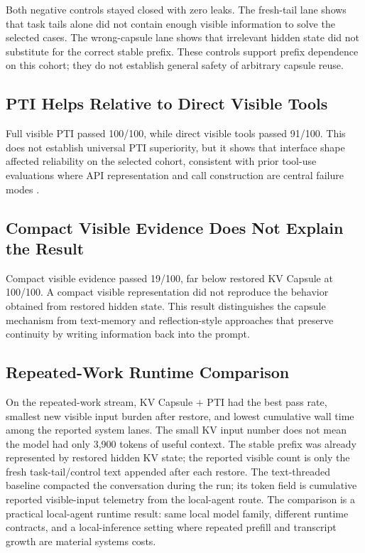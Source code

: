 \documentclass[11pt]{article}
\begin{document}
Both negative controls stayed closed with zero leaks. The fresh-tail lane shows that task tails alone did not contain enough visible information to solve the selected cases. The wrong-capsule lane shows that irrelevant hidden state did not substitute for the correct stable prefix. These controls support prefix dependence on this cohort; they do not establish general safety of arbitrary capsule reuse.

\subsection{PTI Helps Relative to Direct Visible Tools}

Full visible PTI passed 100/100, while direct visible tools passed 91/100. This does not establish universal PTI superiority, but it shows that interface shape affected reliability on the selected cohort, consistent with prior tool-use evaluations where API representation and call construction are central failure modes \cite{bfcl2025,qin2023toollm,patil2023gorilla}.

\subsection{Compact Visible Evidence Does Not Explain the Result}

Compact visible evidence passed 19/100, far below restored KV Capsule at 100/100. A compact visible representation did not reproduce the behavior obtained from restored hidden state. This result distinguishes the capsule mechanism from text-memory and reflection-style approaches that preserve continuity by writing information back into the prompt.

\subsection{Repeated-Work Runtime Comparison}

On the repeated-work stream, KV Capsule + PTI had the best pass rate, smallest new visible input burden after restore, and lowest cumulative wall time among the reported system lanes. The small KV input number does not mean the model had only 3,900 tokens of useful context. The stable prefix was already represented by restored hidden KV state; the reported visible count is only the fresh task-tail/control text appended after each restore. The text-threaded baseline compacted the conversation during the run; its token field is cumulative reported visible-input telemetry from the local-agent route. The comparison is a practical local-agent runtime result: same local model family, different runtime contracts, and a local-inference setting where repeated prefill and transcript growth are material systems costs.
\end{document}
